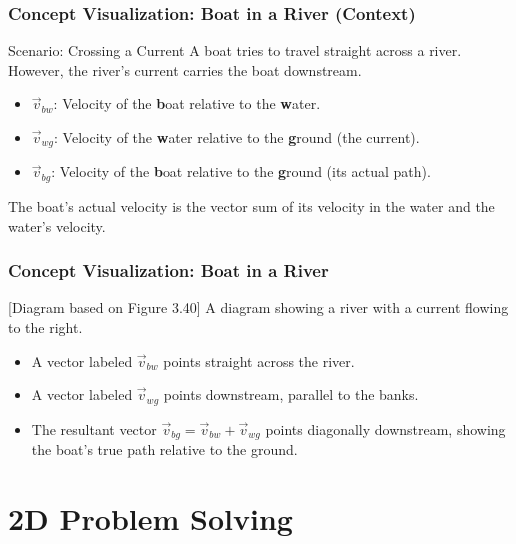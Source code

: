 \documentclass{beamer}
\begin{document}
\begin{frame}
\frametitle{Concept Visualization: Boat in a River (Context)}
\begin{block}{Scenario: Crossing a Current}
A boat tries to travel straight across a river. However, the river's current carries the boat downstream.
\begin{itemize}
    \item $\vec{v}_{bw}$: Velocity of the \textbf{b}oat relative to the \textbf{w}ater.
    \item $\vec{v}_{wg}$: Velocity of the \textbf{w}ater relative to the \textbf{g}round (the current).
    \item $\vec{v}_{bg}$: Velocity of the \textbf{b}oat relative to the \textbf{g}round (its actual path).
\end{itemize}
The boat's actual velocity is the vector sum of its velocity in the water and the water's velocity.
\end{block}
\end{frame}

\begin{frame}
\frametitle{Concept Visualization: Boat in a River}
\begin{alertblock}{[Diagram based on Figure 3.40]}
A diagram showing a river with a current flowing to the right.
\begin{itemize}
    \item A vector labeled $\vec{v}_{bw}$ points straight across the river.
    \item A vector labeled $\vec{v}_{wg}$ points downstream, parallel to the banks.
    \item The resultant vector $\vec{v}_{bg} = \vec{v}_{bw} + \vec{v}_{wg}$ points diagonally downstream, showing the boat's true path relative to the ground.
\end{itemize}
\end{alertblock}
\end{frame}

\section{2D Problem Solving}
\end{document}
